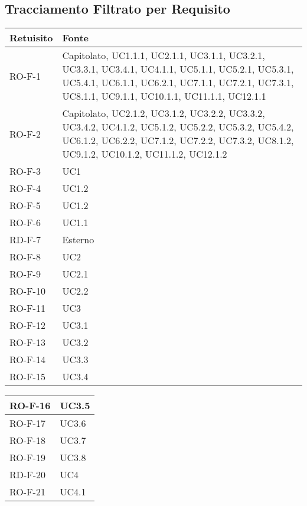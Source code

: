 \subsection{Tracciamento Filtrato per Requisito}
\begin{center}
\renewcommand{\arraystretch}{1.8} %
\begin{tabular}{ |m{8em}|m{13em}| }
    \hline
    \textbf{Retuisito} & \textbf{Fonte} \\
    \hline
    RO-F-1  &   Capitolato, UC1.1.1, UC2.1.1, UC3.1.1, UC3.2.1, UC3.3.1, UC3.4.1, UC4.1.1, UC5.1.1, UC5.2.1, UC5.3.1, UC5.4.1, UC6.1.1, UC6.2.1, UC7.1.1, UC7.2.1, UC7.3.1, UC8.1.1, UC9.1.1, UC10.1.1, UC11.1.1, UC12.1.1 \\
    \hline
    RO-F-2  &   Capitolato, UC2.1.2, UC3.1.2, UC3.2.2, UC3.3.2, UC3.4.2, UC4.1.2, UC5.1.2, UC5.2.2, UC5.3.2, UC5.4.2, UC6.1.2, UC6.2.2, UC7.1.2, UC7.2.2, UC7.3.2, UC8.1.2, UC9.1.2, UC10.1.2, UC11.1.2, UC12.1.2 \\
    \hline
    RO-F-3  &   UC1 \\
    \hline
    RO-F-4  &   UC1.2 \\
    \hline
    RO-F-5  &   UC1.2 \\
    \hline
    RO-F-6  &   UC1.1 \\
    \hline
    RD-F-7  &   Esterno \\
    \hline
    RO-F-8  &   UC2 \\
    \hline
    RO-F-9  &   UC2.1 \\
    \hline
    RO-F-10  &  UC2.2 \\
    \hline
    RO-F-11  &  UC3 \\
    \hline
    RO-F-12  &  UC3.1 \\
    \hline
    RO-F-13  &  UC3.2 \\
    \hline
    RO-F-14  &  UC3.3 \\
    \hline
    RO-F-15  &  UC3.4 \\
    \hline
    \end{tabular}
    \newpage
    \begin{tabular}{ |m{8em}|m{13em}| }
    \hline
    RO-F-16  &  UC3.5 \\
    \hline
    RO-F-17  &  UC3.6 \\
    \hline
    RO-F-18  &  UC3.7 \\
    \hline
    RO-F-19  &  UC3.8 \\
    \hline
    RD-F-20  &  UC4 \\
    \hline
    RO-F-21  &  UC4.1 \\

\end{tabular}
\end{center}
